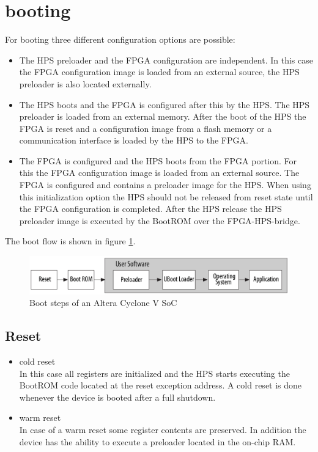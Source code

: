 \section{booting}
For booting three different configuration options are possible:\cite[chapter A]{AlteraHPS15}
\begin{itemize}
\item The HPS preloader and the FPGA configuration are independent. In this case the FPGA configuration image is loaded from an external source, the HPS preloader is also located externally.
\item The HPS boots and the FPGA is configured after this by the HPS. The HPS preloader is loaded from an external memory. After the boot of the HPS the FPGA is reset and a configuration image from a flash memory or a communication interface is loaded by the HPS to the FPGA.
\item The FPGA is configured and the HPS boots from the FPGA portion. For this the FPGA configuration image is loaded from an external source. The FPGA is configured and contains a preloader image for the HPS. When using this initialization option the HPS should not be released from reset state until the FPGA configuration is completed. After the HPS release the HPS preloader image is executed by the BootROM over the FPGA-HPS-bridge.
\end{itemize}
The boot flow is shown in figure \ref{fig:bootstages}.
\begin{figure}[htbp]
\begin{center}
\includegraphics[width=13cm,keepaspectratio=true]{bilder/png/bootstages}
\caption{Boot steps of an Altera Cyclone V SoC\cite[chapter A]{AlteraHPS15}}
\label{fig:bootstages}
\end{center}
\end{figure}
\subsection{Reset}
\begin{itemize}
\item cold reset\\
In this case all registers are initialized and the HPS starts executing the BootROM code located at the reset exception address. A cold reset is done whenever the device is booted after a full shutdown.
\item warm reset\\
In case of a warm reset some register contents are preserved. In addition the device has the ability to execute a preloader located in the on-chip RAM.
\end{itemize}
